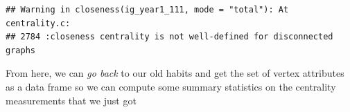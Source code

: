 \documentclass[
]{book}
\newenvironment{Shaded}{\begin{snugshade}}{\end{snugshade}}
\newcommand{\AttributeTok}[1]{\textcolor[rgb]{0.77,0.63,0.00}{#1}}
\newcommand{\CommentTok}[1]{\textcolor[rgb]{0.56,0.35,0.01}{\textit{#1}}}
\newcommand{\ConstantTok}[1]{\textcolor[rgb]{0.00,0.00,0.00}{#1}}
\newcommand{\FunctionTok}[1]{\textcolor[rgb]{0.00,0.00,0.00}{#1}}
\newcommand{\NormalTok}[1]{#1}
\newcommand{\OtherTok}[1]{\textcolor[rgb]{0.56,0.35,0.01}{#1}}
\newcommand{\SpecialCharTok}[1]{\textcolor[rgb]{0.00,0.00,0.00}{#1}}
\newcommand{\StringTok}[1]{\textcolor[rgb]{0.31,0.60,0.02}{#1}}
\begin{document}
\begin{Shaded}
\end{Shaded}

\begin{verbatim}
## Warning in closeness(ig_year1_111, mode = "total"): At centrality.c:
## 2784 :closeness centrality is not well-defined for disconnected graphs
\end{verbatim}

\begin{Shaded}
\end{Shaded}

From here, we can \emph{go back} to our old habits and get the set of vertex attributes as a data frame so we can compute some summary statistics on the centrality measurements that we just got
\end{document}
